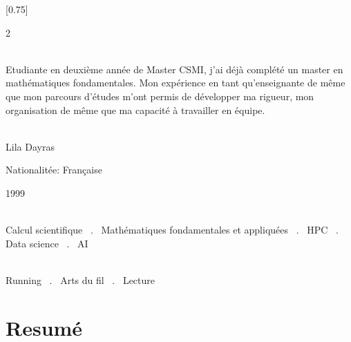 \documentclass[lighthipster]{simplehipstercv}
\begin{document}
\setlength{\columnsep}{1.5cm}
[0.75]
\begin{paracol}{2}

\paracolbackgroundoptions



\footnotesize
{\setasidefontcolour
\flushright
\begin{center}
\end{center}

\\[0.5em]

Etudiante en deuxième année de Master CSMI, j'ai déjà complété un master en mathématiques fondamentales. Mon expérience en tant qu'enseignante de même que mon parcours d'études m'ont permis de 
développer ma rigueur, mon organisation de même que ma capacité à travailler en équipe.
\bigskip

 \\[0.5em]
Lila Dayras

Nationalitée: Française

1999

\bigskip

 \\[0.5em]

Calcul scientifique ~.~ Mathématiques fondamentales et appliquées ~.~ HPC ~.~ Data science ~.~ AI

\bigskip



\bigskip

\\[0.5em]

Running ~.~ Arts du fil ~.~ Lecture

\bigskip


\vspace{4em}



\phantom{turn the page}

\phantom{turn the page}
}
\switchcolumn

\small
\section*{Resumé}


\end{paracol}
\end{document}
